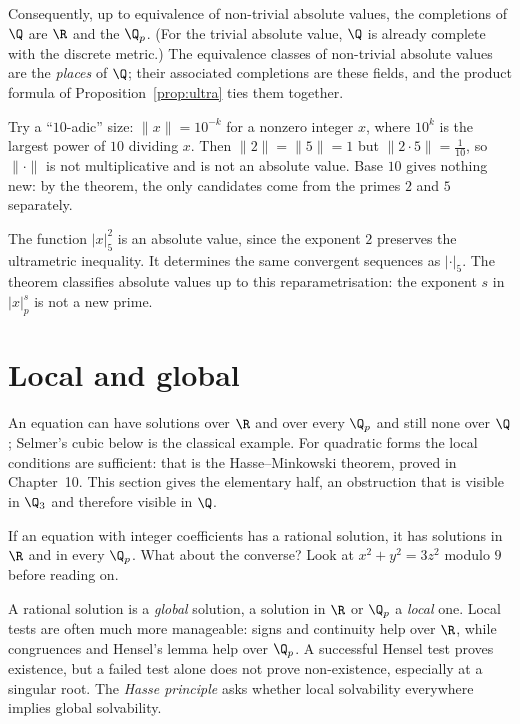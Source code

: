 Consequently, up to equivalence of non-trivial absolute values, the completions of $\Q$ are $\R$ and the $\Q_p$. (For the trivial absolute value, $\Q$ is already complete with the discrete metric.) The equivalence classes of non-trivial absolute values are the \emph{places} of $\Q$; their associated completions are these fields, and the product formula of Proposition~\ref{prop:ultra} ties them together.

\begin{examplex}
Try a ``$10$-adic'' size: $\|x\|=10^{-k}$ for a nonzero integer $x$, where $10^k$ is the largest power of $10$ dividing $x$. Then
$\|2\|=\|5\|=1$ but $\|2\cdot5\|=\frac1{10}$, so $\|\cdot\|$ is not multiplicative and is not an absolute value. Base $10$
gives nothing new: by the theorem, the only candidates come from the primes $2$ and $5$ separately.
\end{examplex}

\begin{examplex}
The function $|x|_5^2$ is an absolute value, since the exponent $2$ preserves the ultrametric inequality. It determines the same convergent sequences as $|\cdot|_5$. The theorem classifies absolute values up to this reparametrisation: the exponent $s$ in $|x|_p^s$ is not a new prime.
\end{examplex}

\section{Local and global}

An equation can have solutions over $\R$ and over every $\Q_p$ and still none over $\Q$; Selmer's cubic below is the classical example. For quadratic forms the local conditions are sufficient: that is the Hasse--Minkowski theorem, proved in Chapter~10. This section gives the elementary half, an obstruction that is visible in $\Q_3$ and therefore visible in $\Q$.

\begin{think}
If an equation with integer coefficients has a rational solution, it has solutions in $\R$ and in every $\Q_p$. What about the converse? Look at $x^2+y^2=3z^2$ modulo $9$ before reading on.
\end{think}

A rational solution is a \emph{global} solution, a solution in $\R$ or $\Q_p$ a \emph{local} one. Local tests are often much more manageable: signs and continuity help over $\R$, while congruences and Hensel's lemma help over $\Q_p$. A successful Hensel test proves existence, but a failed test alone does not prove non-existence, especially at a singular root. The \emph{Hasse principle} asks whether local solvability everywhere implies global solvability.

